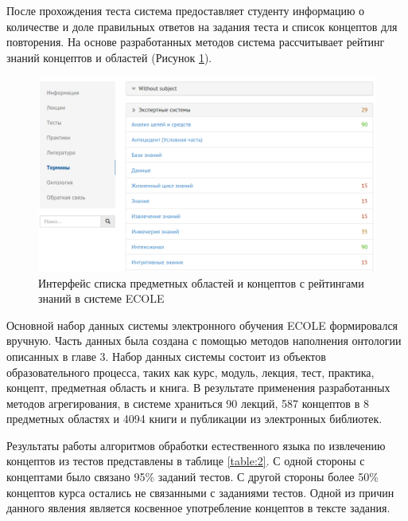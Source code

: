 После прохождения теста система предоставляет студенту информацию о количестве и доле правильных ответов на задания теста и список концептов для повторения. На основе разработанных методов система рассчитывает рейтинг знаний концептов и областей (Рисунок \ref{fig:screen2}).

\begin{figure}[ht] 
  \center
  \includegraphics[scale=0.40]{screen2}
  \caption {Интерфейс списка предметных областей и концептов с рейтингами знаний в системе ECOLE} 
  \label{fig:screen2}
\end{figure}



Основной набор данных системы электронного обучения ECOLE формировался вручную. Часть данных была создана с помощью методов наполнения онтологии описанных в главе 3. Набор данных системы состоит из объектов образовательного процесса, таких как курс, модуль, лекция, тест, практика, концепт, предметная область и книга. В результате применения разработанных методов агрегирования, в системе храниться 90 лекций, 587 концептов в 8 предметных областях и 4094 книги и публикации из электронных библиотек.   

Результаты работы алгоритмов обработки естественного языка по извлечению концептов из тестов представлены в таблице \ref{table:2}. С одной стороны с концептами было связано 95\% заданий тестов. С другой стороны более 50\% концептов курса остались не связанными с заданиями тестов. Одной из причин данного явления является косвенное употребление концептов в тексте задания.


